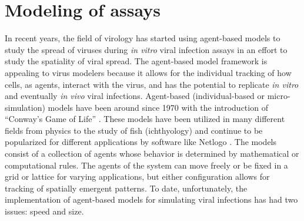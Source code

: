 \section{Modeling of assays}

In recent years, the field of virology has started using agent-based models to study the spread of viruses during \emph{in vitro} viral infection assays \citep{beauchemin_simple_2005,alvarado_cellular-level_2018,wodarz_laws_2014,tong_development_2015,whitman20,goyal16,itakura10,wasik14} in an effort to study the spatiality of viral spread. The agent-based model framework is appealing to virus modelers because it allows for the individual tracking of how cells, as agents, interact with the virus, and has the potential to replicate \emph{in vitro} and eventually \emph{in vivo} viral infections. Agent-based (individual-based or micro-simulation) models have been around since 1970 with the introduction of ``Conway's Game of Life'' \citep{gardner70}. These models have been utilized in many different fields from physics to the study of fish (ichthyology) \citep{owusu20} and continue to be popularized for different applications by software like Netlogo \citep{nogare20,chiacchio14}. The models consist of a collection of agents whose behavior is determined by mathematical or computational rules. The agents of the system can move freely \citep{beauchemin07} or be fixed in a grid or lattice \citep{beauchemin_simple_2005} for varying applications, but either configuration allows for tracking of spatially emergent patterns. To date, unfortunately, the implementation of agent-based models for simulating viral infections has had two issues: speed and size.

